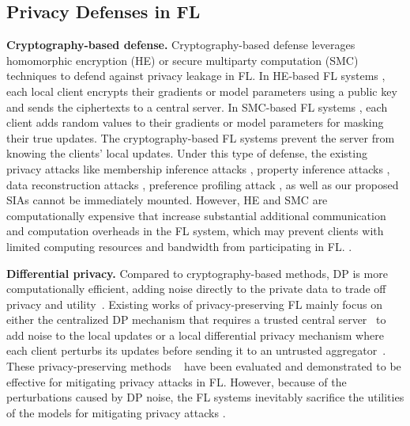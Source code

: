 \documentclass[10pt,journal,compsoc]{IEEEtran}
\begin{document}
\subsection{Privacy Defenses in FL}
\noindent \textbf{Cryptography-based defense.
\;} Cryptography-based defense leverages homomorphic encryption (HE) or secure multiparty computation (SMC) techniques to defend against privacy leakage in FL. In HE-based FL systems \cite{zhang2020batchcrypt,cheng2021secureboost,hardy2017private,liu2019secure,liu2020secure,nikolaenko2013privacy,zheng2022aggregation,jebreel2022enhanced}, each local client encrypts their gradients or model parameters using a public key and sends
the ciphertexts to a central server. In SMC-based FL systems \cite{bonawitz2017practical,mohassel2017secureml}, each client adds random values to their gradients or model parameters for masking their true updates. The cryptography-based FL systems prevent the server from knowing the clients' local updates. Under this type of defense, the existing privacy attacks like membership inference attacks \cite{nasr2019comprehensive}, property inference attacks \cite{melis2019exploiting}, data reconstruction attacks \cite{zhu2019deep,zhao2020idlg,boenisch2021curious}, preference profiling attack \cite{zhou2022ppa}, as well as our proposed SIAs cannot be immediately mounted. However, HE and SMC are computationally expensive that increase substantial additional communication and computation overheads in the FL system, which may prevent clients with limited computing resources and bandwidth from participating in FL. \cite{lyu2022privacy}.



\noindent \textbf{Differential privacy. \;}
{Compared to cryptography-based methods, DP is more computationally efficient, adding noise directly to the private data to trade off privacy and utility~\cite{lyu2022privacy}. Existing works of privacy-preserving FL mainly focus on either the centralized DP mechanism that requires a trusted central server~\cite{geyer2017differentially,mcmahan2018learning} to add noise to the local updates or a local differential privacy mechanism where each client perturbs its updates before sending it to an untrusted aggregator~\cite{truex2019hybrid,sun2020ldp}. These privacy-preserving methods ~\cite{geyer2017differentially,mcmahan2018learning,bonawitz2017practical,li2019fedmd,sun2020ldp,liu2020secure} have been evaluated and demonstrated to be effective for mitigating privacy attacks in FL. However, because of the perturbations caused by DP noise, the FL systems inevitably sacrifice the utilities of the models for mitigating privacy attacks \cite{wei2020federated,yuan2022membership}.}
\end{document}
